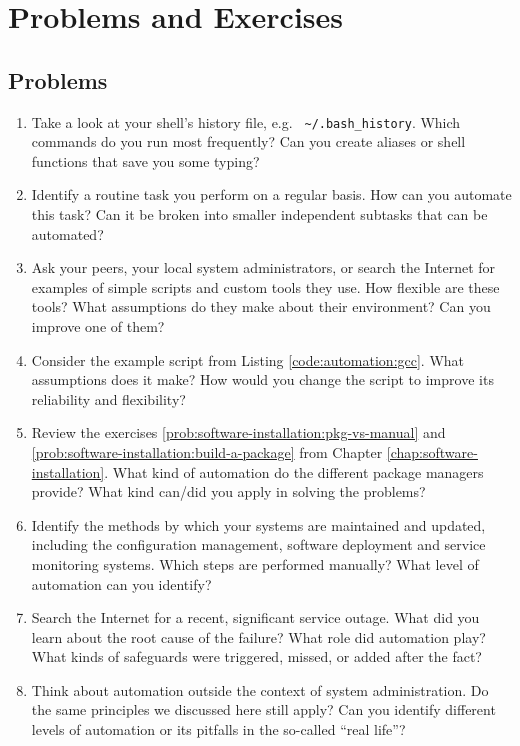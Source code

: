 \vfill
\pagebreak

\chapter*{Problems and Exercises}
\section*{Problems}

\begin{enumerate}

\item
\label{prob:automation:frequently-used}
Take a look at your shell's history file, e.g. {\tt
\~{}/.bash\_history}.  Which commands do you run most
frequently?  Can you create aliases or shell functions
that save you some typing?

\item
\label{prob:automation:routine}
Identify a routine task you perform on a regular
basis.  How can you automate this task?  Can it be
broken into smaller independent subtasks that can be
automated?

\item
Ask your peers, your local system administrators, or
search the Internet for examples of simple scripts and
custom tools they use.  How flexible are these tools?
What assumptions do they make about their environment?
Can you improve one of them?

\item
\label{prob:automation:improve-script}
Consider the example script from Listing
\ref{code:automation:gcc}.  What assumptions
does it make?  How would you change the script to
improve its reliability and flexibility?

\item
Review the exercises
\ref{prob:software-installation:pkg-vs-manual} and
\ref{prob:software-installation:build-a-package} from
Chapter \ref{chap:software-installation}.  What kind
of automation do the different package managers
provide?  What kind can/did you apply in solving the
problems?

\item
Identify the methods by which your systems are
maintained and updated, including the configuration
management, software deployment and service monitoring
systems.  Which steps are performed manually?  What
level of automation can you identify?

\item
Search the Internet for a recent, significant service
outage.  What did you learn about the root cause of
the failure?  What role did automation play?  What
kinds of safeguards were triggered, missed, or added
after the fact?

\item
Think about automation outside the context of system
administration.  Do the same principles we discussed
here still apply?  Can you identify different levels
of automation or its pitfalls in the so-called ``real
life''?

\end{enumerate}

